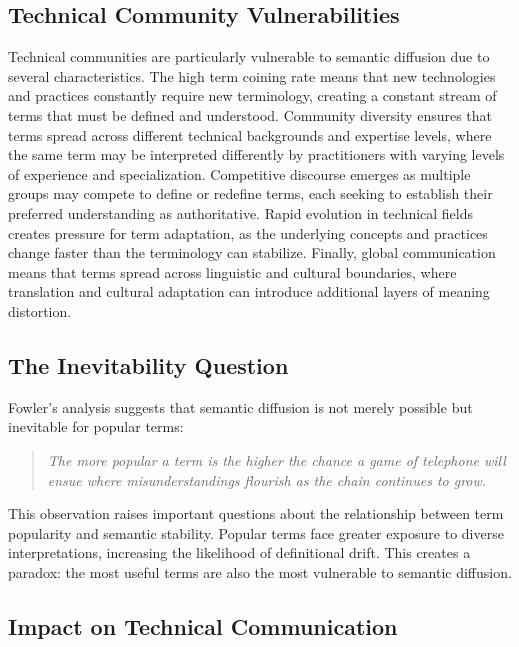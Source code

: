 \documentclass[11pt]{article}
\begin{document}
\subsection{Technical Community Vulnerabilities}

Technical communities are particularly vulnerable to semantic diffusion due to several characteristics. The high term coining rate means that new technologies and practices constantly require new terminology, creating a constant stream of terms that must be defined and understood. Community diversity ensures that terms spread across different technical backgrounds and expertise levels, where the same term may be interpreted differently by practitioners with varying levels of experience and specialization. Competitive discourse emerges as multiple groups may compete to define or redefine terms, each seeking to establish their preferred understanding as authoritative. Rapid evolution in technical fields creates pressure for term adaptation, as the underlying concepts and practices change faster than the terminology can stabilize. Finally, global communication means that terms spread across linguistic and cultural boundaries, where translation and cultural adaptation can introduce additional layers of meaning distortion.

\subsection{The Inevitability Question}

Fowler's analysis suggests that semantic diffusion is not merely possible but inevitable for popular terms:

\begin{quote}
\emph{The more popular a term is the higher the chance a game of telephone will ensue where misunderstandings flourish as the chain continues to grow.}
\end{quote}

This observation raises important questions about the relationship between term popularity and semantic stability. Popular terms face greater exposure to diverse interpretations, increasing the likelihood of definitional drift. This creates a paradox: the most useful terms are also the most vulnerable to semantic diffusion.

\subsection{Impact on Technical Communication}
\end{document}

